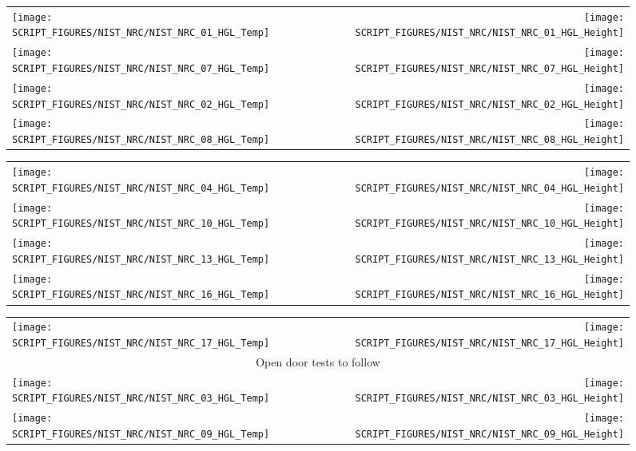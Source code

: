 \begin{figure}[p]
\begin{tabular*}{\textwidth}{l@{\extracolsep{\fill}}r}
\texttt{[image: SCRIPT\_FIGURES/NIST\_NRC/NIST\_NRC\_01\_HGL\_Temp]} &
\texttt{[image: SCRIPT\_FIGURES/NIST\_NRC/NIST\_NRC\_01\_HGL\_Height]} \\
\texttt{[image: SCRIPT\_FIGURES/NIST\_NRC/NIST\_NRC\_07\_HGL\_Temp]} &
\texttt{[image: SCRIPT\_FIGURES/NIST\_NRC/NIST\_NRC\_07\_HGL\_Height]} \\
\texttt{[image: SCRIPT\_FIGURES/NIST\_NRC/NIST\_NRC\_02\_HGL\_Temp]} &
\texttt{[image: SCRIPT\_FIGURES/NIST\_NRC/NIST\_NRC\_02\_HGL\_Height]} \\
\texttt{[image: SCRIPT\_FIGURES/NIST\_NRC/NIST\_NRC\_08\_HGL\_Temp]} &
\texttt{[image: SCRIPT\_FIGURES/NIST\_NRC/NIST\_NRC\_08\_HGL\_Height]}
\end{tabular*}
\end{figure}

\begin{figure}[p]
\begin{tabular*}{\textwidth}{l@{\extracolsep{\fill}}r}
\texttt{[image: SCRIPT\_FIGURES/NIST\_NRC/NIST\_NRC\_04\_HGL\_Temp]} &
\texttt{[image: SCRIPT\_FIGURES/NIST\_NRC/NIST\_NRC\_04\_HGL\_Height]} \\
\texttt{[image: SCRIPT\_FIGURES/NIST\_NRC/NIST\_NRC\_10\_HGL\_Temp]} &
\texttt{[image: SCRIPT\_FIGURES/NIST\_NRC/NIST\_NRC\_10\_HGL\_Height]} \\
\texttt{[image: SCRIPT\_FIGURES/NIST\_NRC/NIST\_NRC\_13\_HGL\_Temp]} &
\texttt{[image: SCRIPT\_FIGURES/NIST\_NRC/NIST\_NRC\_13\_HGL\_Height]} \\
\texttt{[image: SCRIPT\_FIGURES/NIST\_NRC/NIST\_NRC\_16\_HGL\_Temp]} &
\texttt{[image: SCRIPT\_FIGURES/NIST\_NRC/NIST\_NRC\_16\_HGL\_Height]}
\end{tabular*}
\end{figure}

\begin{figure}[p]
\begin{tabular*}{\textwidth}{l@{\extracolsep{\fill}}r}
\texttt{[image: SCRIPT\_FIGURES/NIST\_NRC/NIST\_NRC\_17\_HGL\_Temp]} &
\texttt{[image: SCRIPT\_FIGURES/NIST\_NRC/NIST\_NRC\_17\_HGL\_Height]} \\ [1.in]
\multicolumn{2}{c}{Open door tests to follow} \\ [1.in]
\texttt{[image: SCRIPT\_FIGURES/NIST\_NRC/NIST\_NRC\_03\_HGL\_Temp]} &
\texttt{[image: SCRIPT\_FIGURES/NIST\_NRC/NIST\_NRC\_03\_HGL\_Height]} \\
\texttt{[image: SCRIPT\_FIGURES/NIST\_NRC/NIST\_NRC\_09\_HGL\_Temp]} &
\texttt{[image: SCRIPT\_FIGURES/NIST\_NRC/NIST\_NRC\_09\_HGL\_Height]}
\end{tabular*}
\end{figure}

